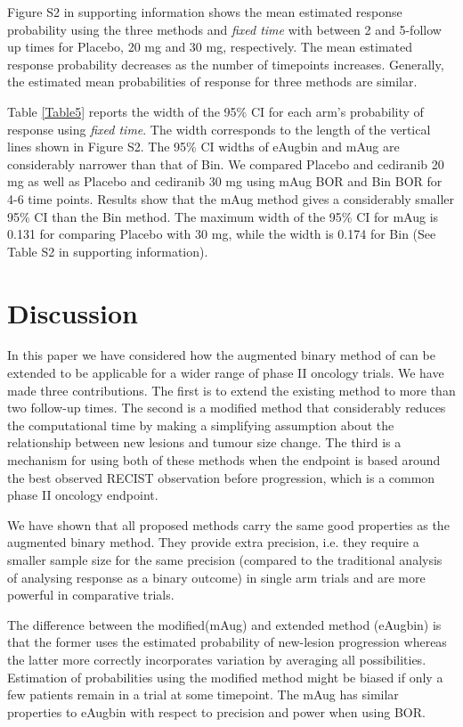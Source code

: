 \documentclass[10pt,A4]{article}
\begin{document}
Figure S2 in supporting information shows the mean estimated response probability using the three methods and \textit{fixed time} with between 2 and 5-follow up times for Placebo, 20 mg and 30 mg, respectively. The mean estimated response probability decreases as the number of timepoints increases. Generally, the estimated mean probabilities of response for three methods are similar.

Table \ref{Table5} reports the width of the 95\% CI for each arm’s probability of response using \textit{fixed time}. The width corresponds to the length of the vertical lines shown in Figure S2. The 95\% CI widths of eAugbin and mAug are considerably narrower than that of Bin. We compared Placebo and cediranib 20 mg as well as Placebo and cediranib 30 mg using mAug BOR and Bin BOR for 4-6 time points. Results show that the mAug method gives a considerably smaller 95\% CI than the Bin method. The maximum width of the 95\% CI for mAug is 0.131 for comparing Placebo with 30 mg, while the width is 0.174 for Bin (See Table S2 in supporting information).


\section{Discussion}\label{sec4}
In this paper we have considered how the augmented binary method of \cite{Wason2013} can be extended to be applicable for a wider range of phase II oncology trials. We have made three contributions. The first is to extend the existing method to more than two follow-up times. The second is a modified method that considerably reduces the computational time by making a simplifying assumption about the relationship between new lesions and tumour size change. The third is a mechanism for using both of these methods when the endpoint is based around the best observed RECIST observation before progression, which is a common phase II oncology endpoint.

We have shown that all proposed methods carry the same good properties as the augmented binary method. They provide extra precision, i.e. they require a smaller sample size for the same precision (compared to the traditional analysis of analysing response as a binary outcome) in single arm trials and are more powerful in comparative trials.

The difference between the modified(mAug) and extended method (eAugbin) is that the former uses the estimated probability of new-lesion progression whereas the latter more correctly incorporates variation by averaging all possibilities. Estimation of probabilities using the modified method might be biased if only a few patients remain in a trial at some timepoint. The mAug has similar properties to eAugbin with respect to precision and power when using BOR.
\end{document}
